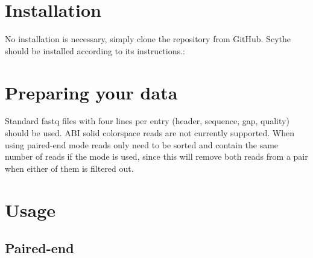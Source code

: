 \documentclass[letterpaper,11pt,english]{sphinxmanual}
\begin{document}
\section{Installation}
\label{\detokenize{intro:installation}}
No installation is necessary, simply clone the repository from GitHub. Scythe should be installed according to its instructions.:

\begin{sphinxVerbatim}[commandchars=\\\{\}]
  
\end{sphinxVerbatim}


\section{Preparing your data}
\label{\detokenize{intro:preparing-your-data}}
Standard fastq files with four lines per entry (header, sequence, gap, quality) should be used.  ABI solid colorspace reads are not currently supported.  When using paired-end mode reads only need to be sorted and contain the same number of reads if the  mode is used, since this will remove both reads from a pair when either of them is filtered out.


\section{Usage}
\label{\detokenize{intro:usage}}

\subsection{Paired-end}
\label{\detokenize{intro:paired-end}}\begin{quote}

\begin{sphinxVerbatim}[commandchars=\\\{\}]
              
\end{sphinxVerbatim}
\end{quote}
\end{document}

